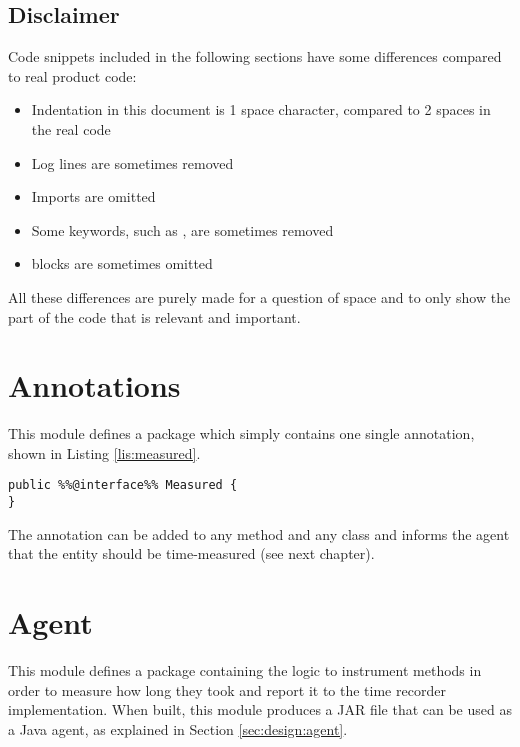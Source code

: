 \subsection{Disclaimer}
Code snippets included in the following sections have some differences compared to real product code:
\begin{itemize}
  \item Indentation in this document is 1 space character, compared to 2 spaces in the real code
  \item Log lines are sometimes removed
  \item Imports are omitted
  \item Some keywords, such as , are sometimes removed
  \item {} blocks are sometimes omitted
\end{itemize}

\noindent All these differences are purely made for a question of space and to only show the part of the code that is relevant and important.

\section{Annotations}
\label{sec:implementation:annotations} 
This module defines a package  which simply contains one single annotation, shown in Listing \ref{lis:measured}.

\noindent\begin{minipage}[c]{\linewidth}
\begin{lstlisting}[caption={Measured annotation},label=lis:measured]
public %%@interface%% Measured {
}
\end{lstlisting}
\end{minipage}

\noindent The annotation can be added to any method and any class and informs the agent that the entity should be time-measured (see next chapter).


\section{Agent}
\label{sec:implementation:agent} 
This module defines a package  containing the logic to instrument methods in order to measure how long they took and report it to the time recorder implementation. When built, this module produces a JAR file that can be used as a Java agent, as explained in Section \ref{sec:design:agent}.

